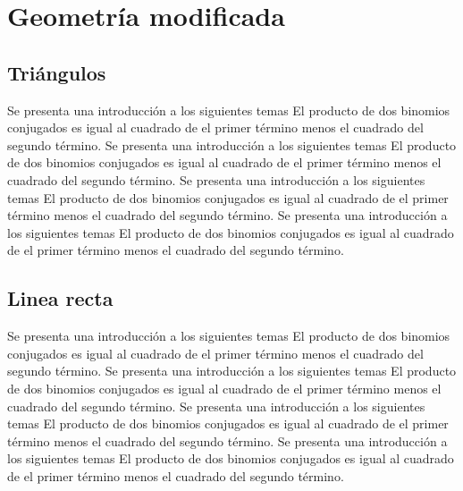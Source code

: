 \chapter{Geometría modificada}
\section{Triángulos}
Se presenta una introducción a los siguientes temas El producto de dos binomios conjugados es igual al cuadrado de el primer término menos el cuadrado del segundo término.
Se presenta una introducción a los siguientes temas El producto de dos binomios conjugados es igual al cuadrado de el primer término menos el cuadrado del segundo término.
Se presenta una introducción a los siguientes temas El producto de dos binomios conjugados es igual al cuadrado de el primer término menos el cuadrado del segundo término.
Se presenta una introducción a los siguientes temas El producto de dos binomios conjugados es igual al cuadrado de el primer término menos el cuadrado del segundo término.

\section{Linea recta}
Se presenta una introducción a los siguientes temas El producto de dos binomios conjugados es igual al cuadrado de el primer término menos el cuadrado del segundo término.
Se presenta una introducción a los siguientes temas El producto de dos binomios conjugados es igual al cuadrado de el primer término menos el cuadrado del segundo término.
Se presenta una introducción a los siguientes temas El producto de dos binomios conjugados es igual al cuadrado de el primer término menos el cuadrado del segundo término.
Se presenta una introducción a los siguientes temas El producto de dos binomios conjugados es igual al cuadrado de el primer término menos el cuadrado del segundo término.

